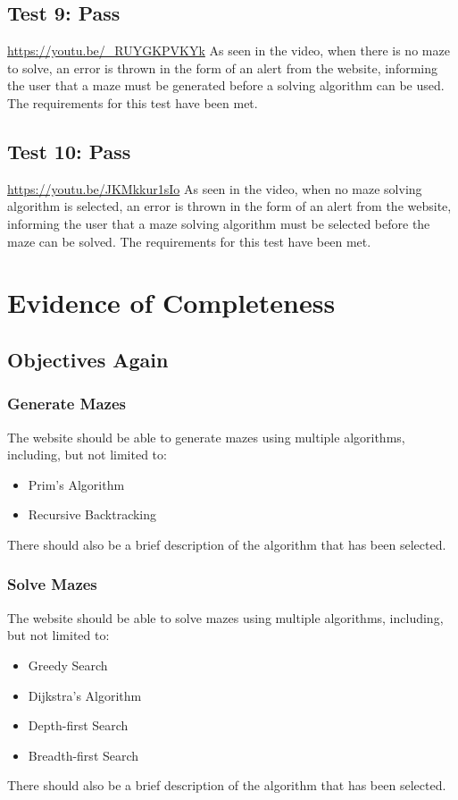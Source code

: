 \documentclass[titlepage]{article}
\begin{document}
\subsection{Test 9: Pass}
\url{https://youtu.be/_RUYGKPVKYk}
As seen in the video, when there is no maze to solve, an error is thrown in the form of an alert from the website, informing the user that a maze must be generated before a solving algorithm can be used. The requirements for this test have been met.

\subsection{Test 10: Pass}
\url{https://youtu.be/JKMkkur1sIo}
As seen in the video, when no maze solving algorithm is selected, an error is thrown in the form of an alert from the website, informing the user that a maze solving algorithm must be selected before the maze can be solved. The requirements for this test have been met.
\newpage
\section{Evidence of Completeness}  
\subsection{Objectives Again}
\subsubsection{Generate Mazes}
The website should be able to generate mazes using multiple algorithms, including, but not limited to:
\begin{itemize}
    \item Prim's Algorithm
    \item Recursive Backtracking
\end{itemize}
There should also be a brief description of the algorithm that has been selected.

\subsubsection{Solve Mazes}
The website should be able to solve mazes using multiple algorithms, including, but not limited to:
\begin{itemize}
    \item Greedy Search
    \item Dijkstra's Algorithm
    \item Depth-first Search
    \item Breadth-first Search
\end{itemize}
There should also be a brief description of the algorithm that has been selected.
\end{document}
